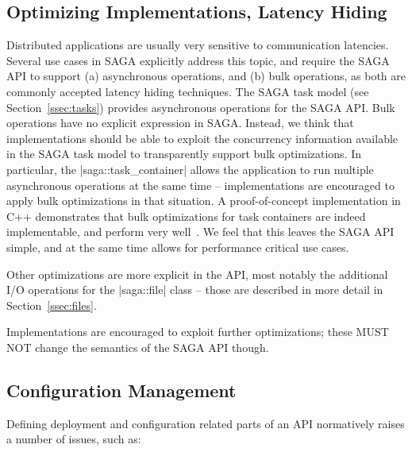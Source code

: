   \subsection{Optimizing Implementations, Latency Hiding}
  \label{ssec:optimization}

   Distributed applications are usually very sensitive to
   communication latencies.  Several use cases in SAGA
   explicitly address this topic, and require the SAGA API to
   support (a) asynchronous operations, and (b) bulk operations,
   as both are commonly accepted latency hiding techniques.  The
   SAGA task model (see Section~\ref{ssec:tasks}) provides
   asynchronous operations for the SAGA API.  Bulk operations
   have no explicit expression in SAGA.  Instead, we think that
   implementations should be able to exploit the concurrency
   information available in the SAGA task model to transparently
   support bulk optimizations.  In particular, the
   |saga::task_container| allows the application to run multiple
   asynchronous operations at the same time -- implementations
   are encouraged to apply bulk optimizations in that situation.
   A proof-of-concept implementation in C++ demonstrates that
   bulk optimizations for task containers are indeed
   implementable, and perform very well~\cite{saga-a-bulks}.  We
   feel that this leaves the SAGA API simple, and at the same
   time allows for performance critical use cases.

   Other optimizations are more explicit in the API, most
   notably the additional I/O operations for the |saga::file|
   class -- those are described in more detail in
   Section~\ref{ssec:files}.

   Implementations are encouraged to exploit further
   optimizations; these MUST NOT change the semantics of the
   SAGA API though.


 \subsection{Configuration Management}

   Defining deployment and
   configuration related parts of an API normatively raises a
   number of issues, such as:


